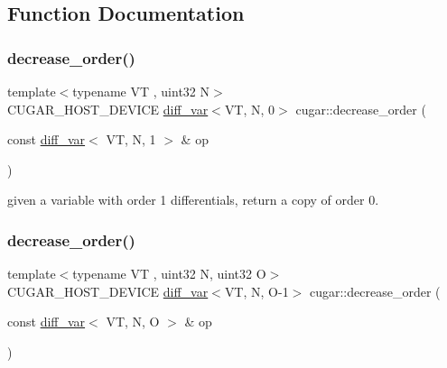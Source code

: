 \subsection{Function Documentation}
\mbox{\label{group___auto_diff_module_ga4a6a026da6c1dfcc17b9b10140883334}} 
\subsubsection{\texorpdfstring{decrease\+\_\+order()}{decrease\_order()}\hspace{0.1cm}{\footnotesize\ttfamily [1/2]}}
{\footnotesize\ttfamily template$<$typename VT , uint32 N$>$ \\
C\+U\+G\+A\+R\+\_\+\+H\+O\+S\+T\+\_\+\+D\+E\+V\+I\+CE \hyperlink{structcugar_1_1diff__var}{diff\+\_\+var}$<$VT, N, 0$>$ cugar\+::decrease\+\_\+order (\begin{DoxyParamCaption}\item[{const \hyperlink{structcugar_1_1diff__var}{diff\+\_\+var}$<$ VT, N, 1 $>$ \&}]{op }\end{DoxyParamCaption})\hspace{0.3cm}{\ttfamily [inline]}}

given a variable with order 1 differentials, return a copy of order 0. \mbox{\label{group___auto_diff_module_ga1ecca883effa0157aba03a1cb7d7d1e9}} 
\subsubsection{\texorpdfstring{decrease\+\_\+order()}{decrease\_order()}\hspace{0.1cm}{\footnotesize\ttfamily [2/2]}}
{\footnotesize\ttfamily template$<$typename VT , uint32 N, uint32 O$>$ \\
C\+U\+G\+A\+R\+\_\+\+H\+O\+S\+T\+\_\+\+D\+E\+V\+I\+CE \hyperlink{structcugar_1_1diff__var}{diff\+\_\+var}$<$VT, N, O-\/1$>$ cugar\+::decrease\+\_\+order (\begin{DoxyParamCaption}\item[{const \hyperlink{structcugar_1_1diff__var}{diff\+\_\+var}$<$ VT, N, O $>$ \&}]{op }\end{DoxyParamCaption})\hspace{0.3cm}{\ttfamily [inline]}}


